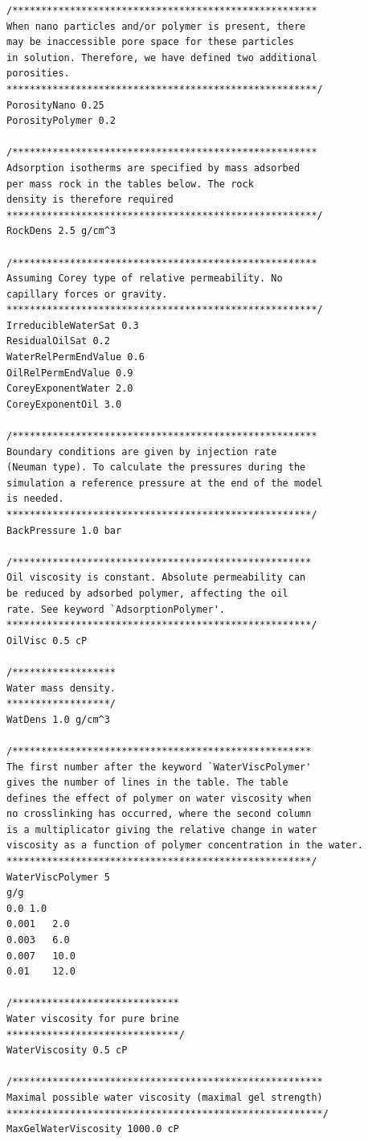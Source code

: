 \begin{appendices}
\begin{lstlisting}
/*****************************************************
When nano particles and/or polymer is present, there 
may be inaccessible pore space for these particles
in solution. Therefore, we have defined two additional 
porosities.
******************************************************/
PorosityNano 0.25
PorosityPolymer 0.2

/*****************************************************
Adsorption isotherms are specified by mass adsorbed 
per mass rock in the tables below. The rock 
density is therefore required 
******************************************************/
RockDens 2.5 g/cm^3

/*****************************************************
Assuming Corey type of relative permeability. No 
capillary forces or gravity.
******************************************************/
IrreducibleWaterSat 0.3
ResidualOilSat 0.2
WaterRelPermEndValue 0.6
OilRelPermEndValue 0.9
CoreyExponentWater 2.0
CoreyExponentOil 3.0

/*****************************************************
Boundary conditions are given by injection rate 
(Neuman type). To calculate the pressures during the
simulation a reference pressure at the end of the model 
is needed.
*****************************************************/
BackPressure 1.0 bar

/****************************************************
Oil viscosity is constant. Absolute permeability can 
be reduced by adsorbed polymer, affecting the oil 
rate. See keyword `AdsorptionPolymer'.
*****************************************************/
OilVisc 0.5 cP

/******************
Water mass density.
******************/
WatDens 1.0 g/cm^3

/****************************************************
The first number after the keyword `WaterViscPolymer'
gives the number of lines in the table. The table 
defines the effect of polymer on water viscosity when 
no crosslinking has occurred, where the second column
is a multiplicator giving the relative change in water 
viscosity as a function of polymer concentration in the water. 
*****************************************************/
WaterViscPolymer 5
g/g    
0.0	1.0  
0.001  	2.0
0.003  	6.0
0.007  	10.0
0.01   	12.0

/*****************************
Water viscosity for pure brine
******************************/
WaterViscosity 0.5 cP

/******************************************************
Maximal possible water viscosity (maximal gel strength) 
*******************************************************/
MaxGelWaterViscosity 1000.0 cP


\end{lstlisting}
\end{appendices}
